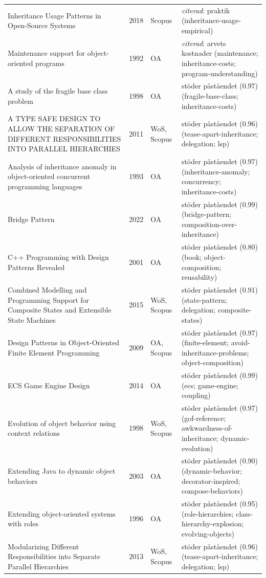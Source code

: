 \begin{longtable}{@{}%
  >{\raggedright\arraybackslash}p{}c%
  >{\raggedright\arraybackslash}p{}%
  >{\raggedright\arraybackslash}p{}@{}}
Inheritance Usage Patterns in Open-Source Systems & 2018 & Scopus & \emph{citerad}: praktik (inheritance-usage-empirical) \\
Maintenance support for object-oriented programs & 1992 & OA & \emph{citerad}: arvets kostnader (maintenance; inheritance-costs; program-understanding) \\
A study of the fragile base class problem & 1998 & OA & stöder påståendet (0.97) (fragile-base-class; inheritance-costs) \\
A TYPE SAFE DESIGN TO ALLOW THE SEPARATION OF DIFFERENT RESPONSIBILITIES INTO PARALLEL HIERARCHIES & 2011 & WoS, Scopus & stöder påståendet (0.96) (tease-apart-inheritance; delegation; lsp) \\
Analysis of inheritance anomaly in object-oriented concurrent programming languages & 1993 & OA & stöder påståendet (0.97) (inheritance-anomaly; concurrency; inheritance-costs) \\
Bridge Pattern & 2022 & OA & stöder påståendet (0.99) (bridge-pattern; composition-over-inheritance) \\
C++ Programming with Design Patterns Revealed & 2001 & OA & stöder påståendet (0.80) (book; object-composition; reusability) \\
Combined Modelling and Programming Support for Composite States and Extensible State Machines & 2015 & WoS, Scopus & stöder påståendet (0.91) (state-pattern; delegation; composite-states) \\
Design Patterns in Object-Oriented Finite Element Programming & 2009 & OA, Scopus & stöder påståendet (0.97) (finite-element; avoid-inheritance-problems; object-composition) \\
ECS Game Engine Design & 2014 & OA & stöder påståendet (0.99) (ecs; game-engine; coupling) \\
Evolution of object behavior using context relations & 1998 & WoS, Scopus & stöder påståendet (0.97) (gof-reference; awkwardness-of-inheritance; dynamic-evolution) \\
Extending Java to dynamic object behaviors & 2003 & OA & stöder påståendet (0.90) (dynamic-behavior; decorator-inspired; compose-behaviors) \\
Extending object-oriented systems with roles & 1996 & OA & stöder påståendet (0.95) (role-hierarchies; class-hierarchy-explosion; evolving-objects) \\
Modularizing Different Responsibilities into Separate Parallel Hierarchies & 2013 & WoS, Scopus & stöder påståendet (0.96) (tease-apart-inheritance; delegation; lsp) \\

\end{longtable}
